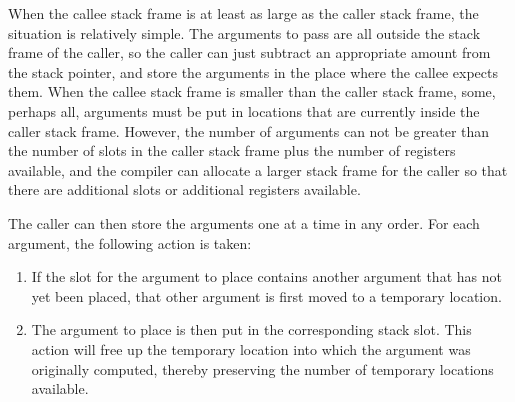 When the callee stack frame is at least as large as the caller stack
frame, the situation is relatively simple.  The arguments to pass are
all outside the stack frame of the caller, so the caller can just
subtract an appropriate amount from the stack pointer, and store the
arguments in the place where the callee expects them.  When the callee
stack frame is smaller than the caller stack frame, some, perhaps all,
arguments must be put in locations that are currently inside the
caller stack frame.  However, the number of arguments can not be
greater than the number of slots in the caller stack frame plus the
number of registers available, and the compiler can allocate a larger
stack frame for the caller so that there are additional slots or
additional registers available.

The caller can then store the arguments one at a time in any order.
For each argument, the following action is taken:

\begin{enumerate}
\item If the slot for the argument to place contains another argument
  that has not yet been placed, that other argument is first moved to
  a temporary location.
\item The argument to place is then put in the corresponding stack
  slot.  This action will free up the temporary location into which
  the argument was originally computed, thereby preserving the number
  of temporary locations available.
\end{enumerate}


